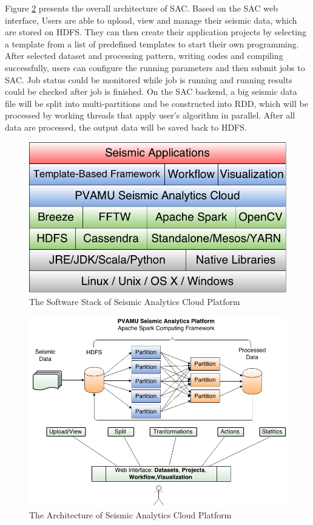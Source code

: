 Figure \ref{SACArch} presents the overall architecture of SAC. Based on the SAC web interface, Users are able to upload, view and manage their seismic data, which are stored on HDFS. They can then create their application projects by selecting a template from a list of predefined templates to start their own programming. After selected dataset and processing pattern, writing codes and compiling successfully, users can configure the running parameters and then submit jobs to SAC. Job status could be monitored while job is running and running results could be checked after job is finished. On the SAC backend, a big seismic data file will be split into multi-partitions and be constructed into RDD, which will be processed by working threads that apply user's algorithm in parallel. After all data are processed, the output data will be saved back to HDFS.

\begin{figure}[H]
\centering
\includegraphics[scale=.50]{figures/SACSWStack.png}
\caption{The Software Stack of Seismic Analytics Cloud Platform}
\label{SACSWStack}
\end{figure}

\begin{figure}[H]
\centering
\includegraphics[scale=.50]{figures/SACArch.png}
\caption{The Architecture of Seismic Analytics Cloud Platform}
\label{SACArch}
\end{figure}

